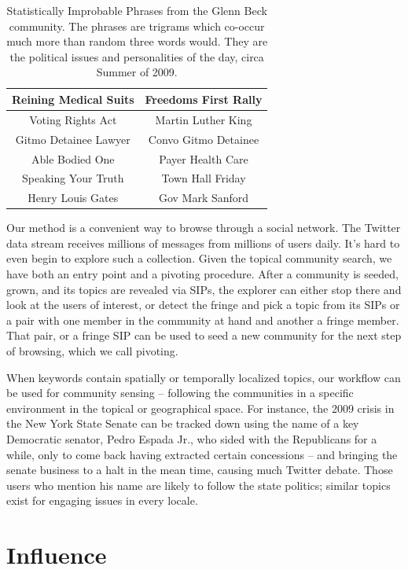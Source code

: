 \documentclass[10pt,oneside]{memoir}
\begin{document}
\begin{Spacing}{2}
\begin{table}
\label{table:gb-sips}
    \centering
\begin{tabular}{|c|c|}
    \hline
    Reining Medical Suits & Freedoms First Rally \\
    \hline
    Voting Rights Act & Martin Luther King \\
    \hline
    Gitmo Detainee Lawyer & Convo Gitmo Detainee \\
    \hline
    Able Bodied One & Payer Health Care \\
    \hline
    Speaking Your Truth & Town Hall Friday \\
    \hline
    Henry Louis Gates & Gov Mark Sanford \\
    \hline 
\end{tabular}
\caption{Statistically Improbable Phrases from the Glenn Beck community.  The phrases are trigrams which co-occur much more than random three words would.  They are the political issues and personalities of the day, circa Summer of 2009.}
\end{table}
Our method is a convenient way to browse through a social network.
The Twitter data stream receives millions of messages from millions
of users daily. It's hard to even begin to explore such a
collection. Given the topical community search, we have both an
entry point and a pivoting procedure. After a community is seeded,
grown, and its topics are revealed via SIPs, the explorer can
either stop there and look at the users of interest, or detect the
fringe and pick a topic from its SIPs or a pair with one member in
the community at hand and another a fringe member. That pair, or a
fringe SIP can be used to seed a new community for the next step of
browsing, which we call pivoting.


When keywords contain spatially or temporally localized topics, our
workflow can be used for community sensing -- following the
communities in a specific environment in the topical or
geographical space. For instance, the 2009 crisis in the New York
State Senate can be tracked down using the name of a key Democratic
senator, Pedro Espada Jr., who sided with the Republicans for a
while, only to come back having extracted certain concessions -- and
bringing the senate business to a halt in the mean time, causing
much Twitter debate. Those users who mention his name are likely to
follow the state politics; similar topics exist for engaging issues
in every locale.


\pagebreak \chapter{Influence}
\label{influence}


\end{Spacing}
\end{document}
